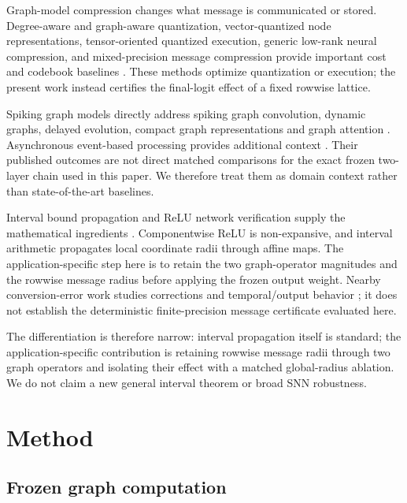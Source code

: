 \documentclass{article}
\begin{document}
Graph-model compression changes what message is communicated or stored. Degree-aware and graph-aware quantization, vector-quantized node representations, tensor-oriented quantized execution, generic low-rank neural compression, and mixed-precision message compression provide important cost and codebook baselines \cite{tailor2021degreequant,ding2021vqgnn,wang2022qgtc,zhu2023a2q,wan2023adaqp,cherukuri2025lowrank,gholami2022quantization,jacob2018quantization,nagel2021white}. These methods optimize quantization or execution; the present work instead certifies the final-logit effect of a fixed rowwise lattice.

Spiking graph models directly address spiking graph convolution, dynamic graphs, delayed evolution, compact graph representations and graph attention \cite{spikinggcn,spikenet,dy-sign,delay-dsgn,signnn,msg,li2023graph1bit,chaurasia2026sgspose,sun2024spikegraphormer,zhang2025sgnnbench}. Asynchronous event-based processing provides additional context \cite{asgcn}. Their published outcomes are not direct matched comparisons for the exact frozen two-layer chain used in this paper. We therefore treat them as domain context rather than state-of-the-art baselines.

Interval bound propagation and ReLU network verification supply the mathematical ingredients \cite{gowal2018ibp,wong2018provable,mirman2018diffai,katz2017reluplex}. Componentwise ReLU is non-expansive, and interval arithmetic propagates local coordinate radii through affine maps. The application-specific step here is to retain the two graph-operator magnitudes and the rowwise message radius before applying the frozen output weight. Nearby conversion-error work studies corrections and temporal/output behavior \cite{li2024erroraware,huang2025ecmt}; it does not establish the deterministic finite-precision message certificate evaluated here.

The differentiation is therefore narrow: interval propagation itself is standard; the application-specific contribution is retaining rowwise message radii through two graph operators and isolating their effect with a matched global-radius ablation. We do not claim a new general interval theorem or broad SNN robustness.

\section{Method}

\label{sec:method}

\subsection{Frozen graph computation}
\end{document}
